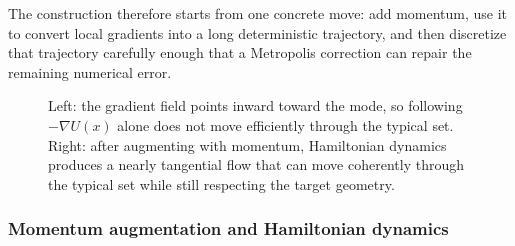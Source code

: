 The construction therefore starts from one concrete move: add momentum, use it to convert local gradients into a long deterministic trajectory, and then discretize that trajectory carefully enough that a Metropolis correction can repair the remaining numerical error.

\begin{figure}[H]
  \centering
  
  \caption{Left: the gradient field points inward toward the mode, so following $-\nabla U(x)$ alone does not move efficiently through the typical set.
  Right: after augmenting with momentum, Hamiltonian dynamics produces a nearly tangential flow that can move coherently through the typical set while still respecting the target geometry.}
  \label{fig:hmc-typical-set}
\end{figure}

\subsubsection{Momentum augmentation and Hamiltonian dynamics}
\label{subsubsec:hmc-augmentation}

